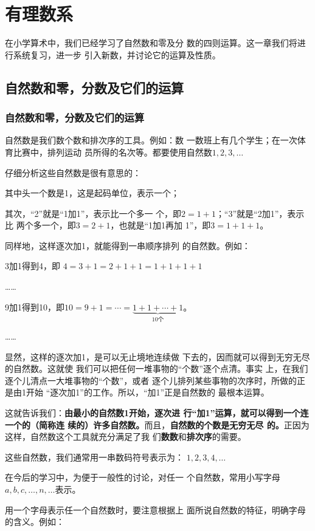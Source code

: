 \chapter{有理数系}

在小学算术中，我们已经学习了自然数和零及分
数的四则运算。这一章我们将进行系统复习，进一步
引入新数，并讨论它的运算及性质。

\section{自然数和零，分数及它们的运算}

\subsection{自然数和零，分数及它们的运算}

自然数是我们数个数和排次序的工具。例如：数
一数班上有几个学生；在一次体育比赛中，排列运动
员所得的名次等。都要使用自然数$1,  2,  3,\ldots$

仔细分析这些自然数是很有意思的：

其中头一个数是1，这是起码单位，表示一个；

其次，“2”就是“1加1”，表示比一个多一
个，即$2=1+1$；“3”就是“2加1”，表示比
两个多一个，即$3=2+1$，也就是“1加1再加
1”，即$3=1+1+1$。

同样地，这样逐次加1，就能得到一串顺序排列
的自然数。例如：  

3加1得到4，即
$4=3+1=2+1+1=1+1+1+1$

……

9加1得到10，即$10= 9+1=\cdots=\underbrace{1+1+\cdots+1}_{10\text{个}}$。

……

显然，这样的逐次加1，是可以无止境地连续做
下去的，因而就可以得到无穷无尽的自然数。这就使
我们可以把任何一堆事物的“个数”逐个点清。事实
上，在我们逐个儿清点一大堆事物的“个数”，或者
逐个儿排列某些事物的次序时，所做的正是由1开始
“逐次加1”的工作。所以，“加1”正是自然数的
最根本运算。

这就告诉我们：\textbf{由最小的自然数1开始，逐次进
	行“加1”运算，就可以得到一个连一个的（简称连
	续的）许多自然数。}而且，\textbf{自然数的个数是无穷无尽
	的。}正因为这样，自然数这个工具就充分满足了我
们\textbf{数数}和\textbf{排次序}的需要。

这些自然数，我们通常用一串数码符号表示为：
$1,2,3,4,\ldots$ 

在今后的学习中，为便于一般性的讨论，对任一
个自然数，常用小写字母$a,b,c,\ldots,n,\ldots$表示。

用一个字母表示任一个自然数时，要注意根据上
面所说自然数的特征，明确字母的含义。例如：

